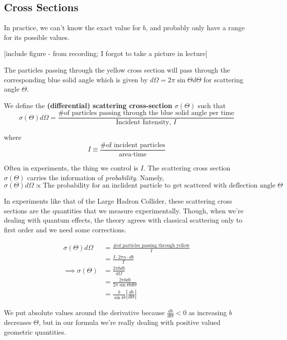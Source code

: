 \documentclass[11pt]{article}
\begin{document}
\vskip 1cm
\subsection{Cross Sections}
In practice, we can't know the exact value for $b$, and probably only have a range for its possible values.

\vskip 0.5cm
[include figure - from recording; I forgot to take a picture in lecture]
\vskip 0.5cm

The particles passing through the yellow cross section will pass through the corresponding blue solid angle which is given by $d\Omega = 2\pi \sin\Theta d\Theta$ for scattering angle $\Theta$.

\vskip 0.5cm
We define the \textbf{(differential) scattering cross-section} 
$\sigma\left(\Theta\right)$ such that 
\[ \sigma\left(\Theta\right) d\Omega = \frac{\text{\# of particles passing through the blue solid angle per time}}{\text{Incident Intensity, }I} \]

where 
\[ I \equiv \frac{\text{\# of incident particles}}{\text{area} \cdot \text{time}} \]

Often in experiments, the thing we control is $I$. The scattering cross section $\sigma(\Theta)$ carries the information of \emph{probability}. Namely, 
\[ \sigma(\Theta) d\Omega \propto \text{The probability for an inclident particle to get scattered with deflection angle } \Theta  \]

In experiments like that of the Large Hadron Collider, these scattering cross sections are the quantities that we measure experimentally. Though, when we're dealing with quantum effects, the theory agrees with classical scattering only to first order and we need some corrections.

\vskip 0.5cm
\begin{align*}
  \sigma(\Theta) d\Omega &= \frac{\text{\# of particles passing through yellow}}{I} \\
  &= \frac{I \cdot 2\pi n \cdot db}{I} \\
  \implies \sigma(\Theta) &= \frac{2\pi b db}{d\Omega} \\
  &= \frac{2\pi b db}{2\pi \sin\Theta d\Theta} \\
  &= \frac{b}{\sin\Theta} \left| \frac{db}{d\Theta} \right|
\end{align*}

\begin{note}
  {We put absolute values around the derivative because $\frac{db}{d\Theta} < 0$ as increasing $b$ decreases $\Theta$, but in our formula we're really dealing with positive valued geometric quantities.}
\end{note}
\end{document}
